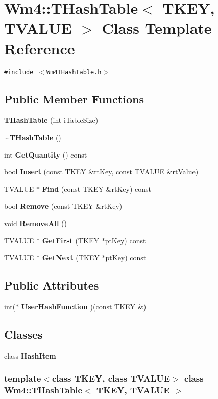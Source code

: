 \section{Wm4::THash\-Table$<$ TKEY, TVALUE $>$ Class Template Reference}
\label{classWm4_1_1THashTable}
{\tt \#include $<$Wm4THash\-Table.h$>$}

\subsection*{Public Member Functions}
\begin{CompactItemize}
\item 
{\bf THash\-Table} (int i\-Table\-Size)
\item 
{\bf $\sim$THash\-Table} ()
\item 
int {\bf Get\-Quantity} () const
\item 
bool {\bf Insert} (const TKEY \&rt\-Key, const TVALUE \&rt\-Value)
\item 
TVALUE $\ast$ {\bf Find} (const TKEY \&rt\-Key) const
\item 
bool {\bf Remove} (const TKEY \&rt\-Key)
\item 
void {\bf Remove\-All} ()
\item 
TVALUE $\ast$ {\bf Get\-First} (TKEY $\ast$pt\-Key) const 
\item 
TVALUE $\ast$ {\bf Get\-Next} (TKEY $\ast$pt\-Key) const 
\end{CompactItemize}
\subsection*{Public Attributes}
\begin{CompactItemize}
\item 
int($\ast$ {\bf User\-Hash\-Function} )(const TKEY \&)
\end{CompactItemize}
\subsection*{Classes}
\begin{CompactItemize}
\item 
class \textbf{Hash\-Item}
\end{CompactItemize}
\subsubsection*{template$<$class TKEY, class TVALUE$>$ class Wm4::THash\-Table$<$ TKEY, TVALUE $>$}



